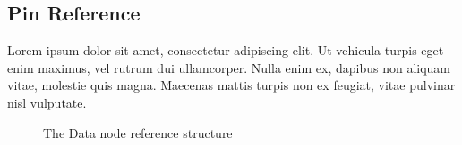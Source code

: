 \subsection{Pin Reference}

Lorem ipsum dolor sit amet, consectetur adipiscing elit. Ut vehicula turpis eget enim maximus, vel rutrum dui ullamcorper. Nulla enim ex, dapibus non aliquam vitae, molestie quis magna. Maecenas mattis turpis non ex feugiat, vitae pulvinar nisl vulputate.

\begin{figure}[!ht]
	\centering
	
	\caption{The Data node reference structure}
	\label{fig:pin_reference}
\end{figure}
